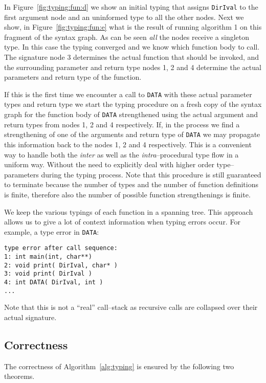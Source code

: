\documentclass{sigplanconf}
\begin{document}
In Figure~\ref{fig:typing:fun:d} we show an initial typing that
assigns \verb+DirIval+ to the first argument node and an uninformed
type to all the other nodes. Next we show, in
Figure~\ref{fig:typing:fun:e} what is the result of running algorithm
1 on this fragment of the syntax graph. As can be seen \emph{all} the
nodes receive a singleton type. In this case the typing converged and
we know which function body to call. The signature node 3 determines
the actual function that should be invoked, and the surrounding
parameter and return type nodes 1, 2 and 4 determine the actual
parameters and return type of the function.

If this is the first time we encounter a call to \verb+DATA+ with
these actual parameter types and return type we start the typing
procedure on a fresh copy of the syntax graph for the function body of
\verb+DATA+ strengthened using the actual argument and return types
from nodes 1, 2 and 4 respectively. If, in the process we find a
strengthening of one of the arguments and return type of \verb+DATA+
we may propagate this information back to the nodes 1, 2 and 4
respectively. This is a convenient way to handle both the \emph{inter}
as well as the \emph{intra}--procedural type flow in a uniform
way. Without the need to explicitly deal with higher order
type--parameters during the typing process. Note that this procedure
is still guaranteed to terminate because the number of types and the
number of function definitions is finite, therefore also the number of
possible function strengthenings is finite.

We keep the various typings of each function in a spanning tree. This
approach allows us to give a lot of context information when typing
errors occur. For example, a type error in \verb+DATA+:
\begin{samepage}
\begin{verbatim}
type error after call sequence:
1: int main(int, char**)
2: void print( DirIval, char* )
3: void print( DirIval )
4: int DATA( DirIval, int )
...
\end{verbatim}
\end{samepage}
Note that this is not a ``real'' call--stack as recursive calls are
collapsed over their actual signature.

\subsection{Correctness}

The correctness of Algorithm~\ref{alg:typing} is ensured by the
following two theorems.
\end{document}
